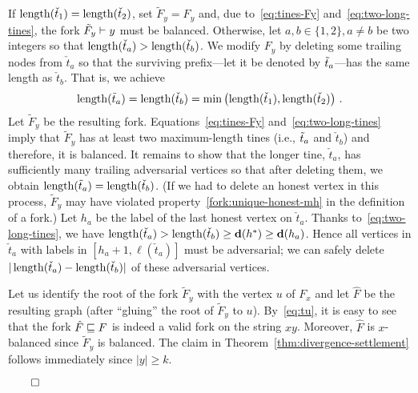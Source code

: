     If $\operatorname{length}(\check{t}_1) = \operatorname{length}(\check{t}_2)$, set $\tilde{F}_y = F_y$ 
    and, due to~\eqref{eq:tines-Fy} and~\eqref{eq:two-long-tines}, 
    the fork $\tilde{F}_y \vdash y$ must be balanced. 
    Otherwise, 
    let $a, b \in \{1, 2\}, a \neq b$ be two integers so that 
    $\operatorname{length}(\check{t}_a) > \operatorname{length}(\check{t}_b)$. 
    We modify $F_y$ by deleting some trailing nodes from $\check{t}_a$ 
    so that the surviving prefix---let it be denoted by $\tilde{t}_a$---has the same length as $\check{t}_b$. 
    That is, we achieve 
    \[
      \operatorname{length}(\tilde{t}_a) = \operatorname{length}(\check{t}_b) = \min\left(\operatorname{length}(\check{t}_1), \operatorname{length}(\check{t}_2) \right)
      \,. 
    \]
    Let $\tilde{F}_y$ be the resulting fork. 
    Equations~\eqref{eq:tines-Fy} and~\eqref{eq:two-long-tines} imply that 
    $\tilde{F}_y$ has at least two maximum-length tines (i.e., $\tilde{t}_a$ and $\check{t}_b$) 
    and therefore, it is balanced.
    It remains to show that the longer tine, $\check{t}_a$, 
    has sufficiently many trailing adversarial vertices so that after deleting them, 
    we obtain 
    $\operatorname{length}(\tilde{t}_a) = \operatorname{length}(\check{t}_b)$. 
    (If we had to delete an honest vertex in this process, 
    $\tilde{F}_y$ may have violated 
    property~\ref{fork:unique-honest-mh} in the definition of a fork.)    
    Let $h_a$ be the label of the last honest vertex 
    on $\check{t}_a$. 
    Thanks to~\eqref{eq:two-long-tines}, 
    we have 
    $\operatorname{length}(\check{t}_a) > \operatorname{length}(\check{t}_b) \geq \mathbf{d}(h^*) \geq \mathbf{d}(h_a)$. 
    Hence all vertices in $\check{t}_a$ 
    with labels in $[h_a + 1, \ell(\check{t}_a)]$ 
    must be adversarial; 
    we can safely delete $|\operatorname{length}(\check{t}_a) - \operatorname{length}(\check{t}_b)|$ 
    of these adversarial vertices.

    
    Let us identify the root of the fork $\tilde{F}_y$ with the vertex $u$ of $F_x$ and 
    let $\hat{F}$ be the resulting graph (after ``gluing'' the root of $\tilde{F}_y$ to $u$). 
    By~\eqref{eq:tu}, it is easy to see that the fork 
    $\hat{F} \sqsubseteq F$ 
    is indeed a valid fork on the string $x y$. 
    Moreover, $\hat{F}$ is $x$-balanced since $\tilde{F}_y$ is balanced. 
    The claim in Theorem~\ref{thm:divergence-settlement} follows immediately since $|y| \geq k$.
  
    \hfill$\qed$


